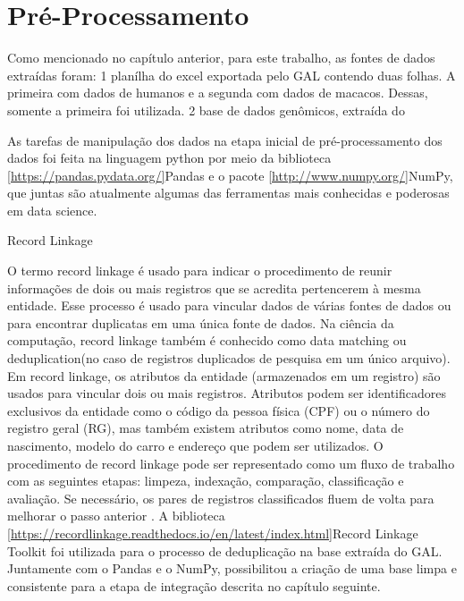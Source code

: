 \chapter{Pré-Processamento}


Como mencionado no capítulo anterior, para este trabalho, as fontes de dados extraídas foram:
1 planílha do excel exportada pelo GAL contendo duas folhas. A primeira com dados de humanos e a segunda com dados de macacos. Dessas, somente a primeira foi utilizada.
2 base de dados genômicos, extraída do \cite{federhen2011ncbi}


As tarefas de manipulação dos dados na etapa inicial de pré-processamento dos dados foi feita na linguagem python por meio da biblioteca \ref{https://pandas.pydata.org/}{Pandas} e o pacote \ref{http://www.numpy.org/}{NumPy}, que juntas são atualmente algumas das ferramentas mais conhecidas e poderosas em data science.

Record Linkage

O termo record linkage é usado para indicar o procedimento de reunir informações de dois ou mais registros que se acredita pertencerem à mesma entidade.
Esse processo é usado para vincular dados de várias fontes de dados ou para encontrar duplicatas em uma única fonte de dados.
Na ciência da computação, record linkage também é conhecido como data matching ou deduplication(no caso de registros duplicados de pesquisa em um único arquivo).
Em record linkage, os atributos da entidade (armazenados em um registro) são usados para vincular dois ou mais registros.
Atributos podem ser identificadores exclusivos da entidade como o código da pessoa física (CPF) ou o número do registro geral (RG), mas também existem atributos como nome, data de nascimento, modelo do carro e endereço que podem ser utilizados.
O procedimento de record linkage pode ser representado como um fluxo de trabalho com as seguintes etapas: limpeza, indexação, comparação, classificação e avaliação. Se necessário, os pares de registros classificados fluem de volta para melhorar o passo anterior \cite{christen2012data}.
A biblioteca \ref{https://recordlinkage.readthedocs.io/en/latest/index.html}{Record Linkage Toolkit} foi utilizada para o processo de deduplicação na base extraída do GAL. Juntamente com o Pandas e o NumPy, possibilitou a criação de uma base limpa e consistente para a etapa de integração descrita no capítulo seguinte.